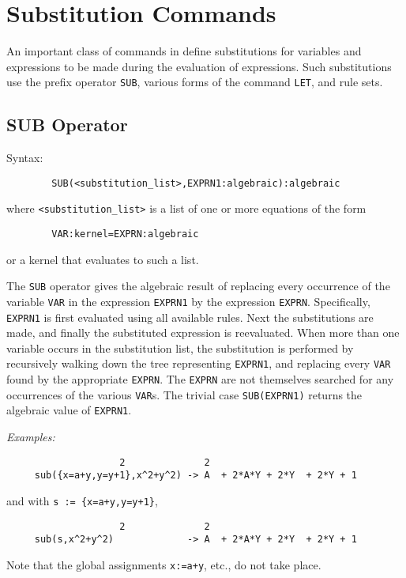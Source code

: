 \chapter{Substitution Commands}
An important class of commands in {\REDUCE} define
substitutions for variables and expressions to be made during the
evaluation of expressions.  Such substitutions use the prefix operator
{\tt SUB}, various forms of the command {\tt LET}, and rule sets.

\section{SUB Operator}
\hypertarget{operator:SUB}{}

Syntax:
\begin{verbatim}
        SUB(<substitution_list>,EXPRN1:algebraic):algebraic
\end{verbatim}
where {\tt <substitution\_list>} is a list of one or more equations of the
form
\begin{verbatim}
        VAR:kernel=EXPRN:algebraic
\end{verbatim}
or a kernel that evaluates to such a list.

The {\tt SUB} operator gives the algebraic result of replacing every
occurrence of the variable {\tt VAR} in the expression {\tt EXPRN1} by the
expression {\tt EXPRN}.  Specifically, {\tt EXPRN1} is first evaluated
using all available rules.  Next the substitutions are made, and finally
the substituted expression is reevaluated.  When more than one variable
occurs in the substitution list, the substitution is performed by
recursively walking down the tree representing {\tt EXPRN1}, and replacing
every {\tt VAR} found by the appropriate {\tt EXPRN}.  The {\tt EXPRN} are
not themselves searched for any occurrences of the various {\tt VAR}s.
The trivial case {\tt SUB(EXPRN1)} returns the algebraic value of
{\tt EXPRN1}.

{\it Examples:}
\begin{verbatim}
				    2              2
     sub({x=a+y,y=y+1},x^2+y^2) -> A  + 2*A*Y + 2*Y  + 2*Y + 1
\end{verbatim}
and with {\tt s := \{x=a+y,y=y+1\}},
\begin{verbatim}
				    2              2
     sub(s,x^2+y^2)             -> A  + 2*A*Y + 2*Y  + 2*Y + 1
\end{verbatim}

Note that the global assignments {\tt x:=a+y}, etc., do not take place.


